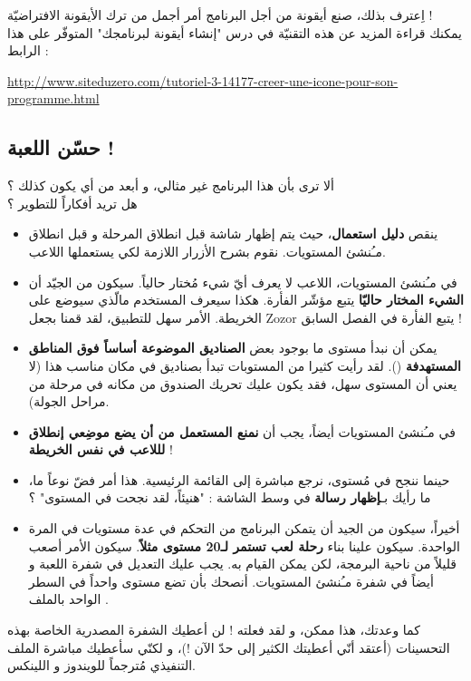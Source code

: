 
اِعترف بذلك، صنع أيقونة من أجل البرنامج أمر أجمل من ترك الأيقونة الافتراضيّة !\\
يمكنك قراءة المزيد عن هذه التقنيّة في درس "إنشاء أيقونة لبرنامجك" المتوفّر على هذا الرابط :

\url{http://www.siteduzero.com/tutoriel-3-14177-creer-une-icone-pour-son-programme.html}

\subsection{حسّن اللعبة !}

ألا ترى بأن هذا البرنامج غير مثالي، و أبعد من أي يكون كذلك ؟\\
هل تريد أفكاراً للتطوير ؟

\begin{itemize}
	\item ينقص
	\textbf{دليل استعمال}،
	حيث يتم إظهار شاشة قبل انطلاق المرحلة و قبل انطلاق مـُنشئ المستويات. نقوم بشرح الأزرار اللازمة لكي يستعملها اللاعب.
	\item في مـُنشئ المستويات، اللاعب لا يعرف أيّ شيء مُختار حالياً. سيكون من الجيّد أن 
	\textbf{الشيء المختار حاليّا}
	يتبع مؤشّر الفأرة. هكذا سيعرف المستخدم مالّذي سيوضع على الخريطة. الأمر سهل للتطبيق، لقد قمنا بجعل
	\textenglish{Zozor}
	يتبع الفأرة في الفصل السابق !
	\item يمكن أن نبدأ مستوى ما بوجود بعض
	\textbf{الصناديق الموضوعة أساساً فوق المناطق المستهدفة}
	().
	لقد رأيت كثيرا من المستوبات تبدأ بصناديق في مكان مناسب هذا (لا يعني أن المستوى سهل، فقد يكون عليك تحريك الصندوق من مكانه في مرحلة من مراحل الجولة).
	\item في مـُنشئ المستويات أيضاً، يجب أن
	\textbf{نمنع المستعمل من أن يضع موضِعي إنطلاق لللاعب في نفس الخريطة} !
	\item حينما ننجح في مُستوى، نرجع مباشرة إلى القائمة الرئيسية. هذا أمر فضّ نوعاً ما، ما رأيك بـ\textbf{إظهار رسالة}
	في وسط الشاشة : "هنيئاً، لقد نجحت في المستوى" ؟
	\item أخيراً، سيكون من الجيد أن يتمكن البرنامج من التحكم في عدة مستويات في المرة الواحدة. سيكون علينا بناء
	\textbf{رحلة لعب تستمر لـ20 مستوى مثلاً}.
	سيكون الأمر أصعب قليلاً من ناحية البرمجة، لكن يمكن القيام به. يجب عليك التعديل في شفرة اللعبة و أيضاً في شفرة مـُنشئ المستويات. أنصحك بأن تضع مستوى واحداً في السطر الواحد بالملف
	.
\end{itemize}

كما وعدتك، هذا ممكن، و لقد فعلته ! 
لن أعطيك الشفرة المصدرية الخاصة بهذه التحسينات (أعتقد أنّي أعطيتك الكثير إلى حدّ الآن !)، و لكنّي سأعطيك مباشرة الملف التنفيذي مُترجماً للويندوز و اللينكس.

